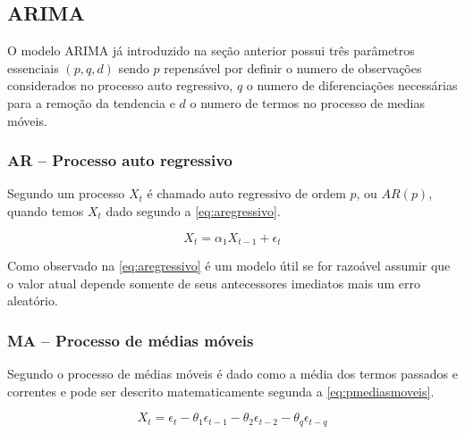 \documentclass[
    12pt,
    oneside,
    a4paper,
    english,
    brazil
]{abntex2}
\begin{document}

\subsection{ARIMA}

O modelo ARIMA já introduzido na seção anterior possui três parâmetros
essenciais $(p,q,d)$ sendo $p$ repensável por definir o numero de observações
considerados no processo auto regressivo, $q$ o numero de diferenciações
necessárias para a remoção da tendencia e $d$ o numero de termos no processo de
medias móveis.

\subsubsection{AR -- Processo auto regressivo}


Segundo  um processo $X_t$ é chamado auto regressivo de
ordem $p$, ou $AR(p)$, quando temos $X_t$ dado segundo a
\autoref{eq:aregressivo}.

\begin{equation}
    \label{eq:aregressivo}
    X_t = \alpha_1X_{t-1}+\epsilon_t
\end{equation}

Como observado na \autoref{eq:aregressivo} é um modelo útil se for razoável
assumir que o valor atual depende somente de seus antecessores imediatos mais
um erro aleatório.

\subsubsection{MA -- Processo de médias móveis}


Segundo  o processo de médias móveis é dado como
a média dos termos passados e correntes e pode ser descrito matematicamente
segunda a \autoref{eq:pmediasmoveis}.

\begin{equation}
    \label{eq:pmediasmoveis}
    X_t = \epsilon_t - \theta_1\epsilon_{t-1} - \theta_2\epsilon_{t-2} - \theta_{q}\epsilon_{t-q}
\end{equation}
\end{document}
